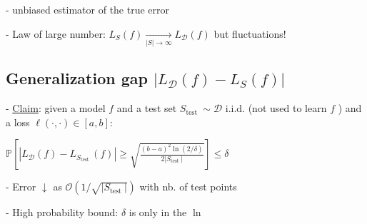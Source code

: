 - unbiased estimator of the true error

- Law of large number: $L_{S}(f) \underset{|S| \rightarrow \infty}{\rightarrow} L_{\mathscr{D}}(f)$ but fluctuations!







\subsection*{Generalization gap $|L_{\mathscr{D}}(f)-L_{S}(f)|$}


- \underline{Claim}: given a model $f$ and a test set $S_{\text {test }} \sim \mathscr{D}$ i.i.d. (not used to learn $f$ ) and a loss $\ell(\cdot, \cdot) \in[a, b]$:

$
\mathbb{P}[|L_{\mathscr{D}}(f)-L_{S_{\text {test }}}(f)| \geq \sqrt{\frac{(b-a)^{2} \ln (2 / \delta)}{2|S_{\text {test }}|}}] \leq \delta
$

- Error $\downarrow$ as $\mathcal{O}(1 / \sqrt{|S_{\text {test }}|})$ with nb. of test points 

- High probability bound: $\delta$ is only in the $\ln$





